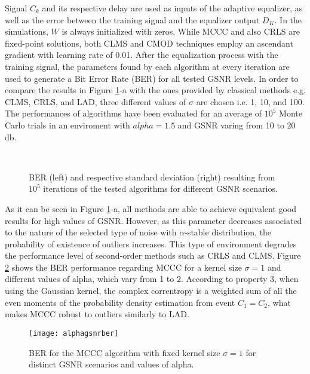 \documentclass[preprint,12pt]{elsarticle}
\begin{document}
Signal $C_k$ and its respective delay are used as inputs of the adaptive equalizer, as well as the error between the training signal and the equalizer output $D_K$. In the simulations, $W$ is always initialized with zeros. While MCCC and also CRLS are fixed-point solutions, both CLMS and CMOD  techniques employ an ascendant gradient with learning rate of 0.01. After the equalization process with the training signal, the parameters found by each algorithm at every iteration are used to generate a Bit Error Rate (BER) for all tested GSNR levels. In order to compare the results in Figure \ref{ber}-a with the ones provided by classical methods e.g. CLMS, CRLS, and LAD, three different values of $\sigma$ are chosen i.e. 1, 10, and 100. The performances of algorithms have been evaluated for an average of $10^{5}$ Monte Carlo trials in an enviroment with $alpha=1.5$ and GSNR varing from 10 to 20 db.



\begin{figure}[H]
\centering
{} 
\\
\caption{BER (left) and respective standard deviation (right) resulting from $10^5$ iterations of the tested algorithms for different GSNR scenarios.}
\label{ber} 
\end{figure}


As it can be seen in Figure \ref{ber}-a, all methods are able to achieve equivalent good results for high values of GSNR. However, as this parameter decreases associated to the nature of the selected type of noise with $\alpha$-stable distribution, the probability of existence of outliers increases. This type of environment degrades the performance level of second-order methods such as CRLS and CLMS. Figure \ref{3d2} shows the BER performance regarding MCCC for a kernel size $\sigma=1$ and different values of alpha, which vary from 1 to 2. According to property 3, when using the Gaussian kernel, the complex correntropy is a weighted sum of all the even moments of the probability density estimation from event $C_1 = C_2$, what makes MCCC robust to outliers similarly to LAD.


\begin{figure}[H]
	\centering
	\texttt{[image: alphagsnrber]}
	\caption{BER for the MCCC algorithm with fixed kernel size $\sigma=1$ for distinct GSNR scenarios and values of alpha.} 
	\label{3d2}
\end{figure}
\end{document}
